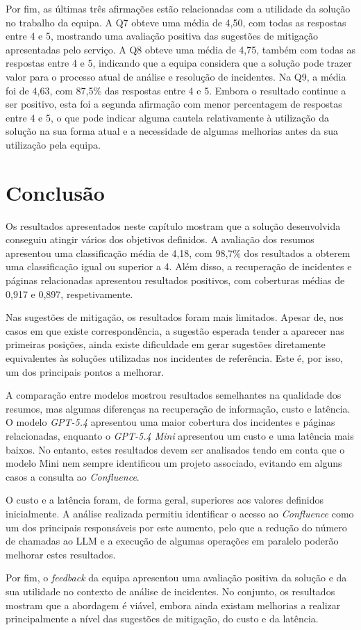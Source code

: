 		Por fim, as últimas três afirmações estão relacionadas com a utilidade da solução no trabalho da equipa. A Q7 obteve uma média de 4,50, com todas as respostas entre 4 e 5, mostrando uma avaliação positiva das sugestões de mitigação apresentadas pelo serviço. A Q8 obteve uma média de 4,75, também com todas as respostas entre 4 e 5, indicando que a equipa considera que a solução pode trazer valor para o processo atual de análise e resolução de incidentes. Na Q9, a média foi de 4,63, com 87,5\% das respostas entre 4 e 5. Embora o resultado continue a ser positivo, esta foi a segunda afirmação com menor percentagem de respostas entre 4 e 5, o que pode indicar alguma cautela relativamente à utilização da solução na sua forma atual e a necessidade de algumas melhorias antes da sua utilização pela equipa.

\section{Conclusão}

	Os resultados apresentados neste capítulo mostram que a solução desenvolvida conseguiu atingir vários dos objetivos definidos. A avaliação dos resumos apresentou uma classificação média de 4,18, com 98,7\% dos resultados a obterem uma classificação igual ou superior a 4. Além disso, a recuperação de incidentes e páginas relacionadas apresentou resultados positivos, com coberturas médias de 0,917 e 0,897, respetivamente.
	
	Nas sugestões de mitigação, os resultados foram mais limitados. Apesar de, nos casos em que existe correspondência, a sugestão esperada tender a aparecer nas primeiras posições, ainda existe dificuldade em gerar sugestões diretamente equivalentes às soluções utilizadas nos incidentes de referência. Este é, por isso, um dos principais pontos a melhorar.
	
	A comparação entre modelos mostrou resultados semelhantes na qualidade dos resumos, mas algumas diferenças na recuperação de informação, custo e latência. O modelo \textit{GPT-5.4} apresentou uma maior cobertura dos incidentes e páginas relacionadas, enquanto o \textit{GPT-5.4 Mini} apresentou um custo e uma latência mais baixos. No entanto, estes resultados devem ser analisados tendo em conta que o modelo Mini nem sempre identificou um projeto associado, evitando em alguns casos a consulta ao \textit{Confluence}.
	
	O custo e a latência foram, de forma geral, superiores aos valores definidos inicialmente. A análise realizada permitiu identificar o acesso ao \textit{Confluence} como um dos principais responsáveis por este aumento, pelo que a redução do número de chamadas ao \gls{LLM} e a execução de algumas operações em paralelo poderão melhorar estes resultados.
	
	Por fim, o \textit{feedback} da equipa apresentou uma avaliação positiva da solução e da sua utilidade no contexto de análise de incidentes. No conjunto, os resultados mostram que a abordagem é viável, embora ainda existam melhorias a realizar principalmente a nível das sugestões de mitigação, do custo e da latência.
